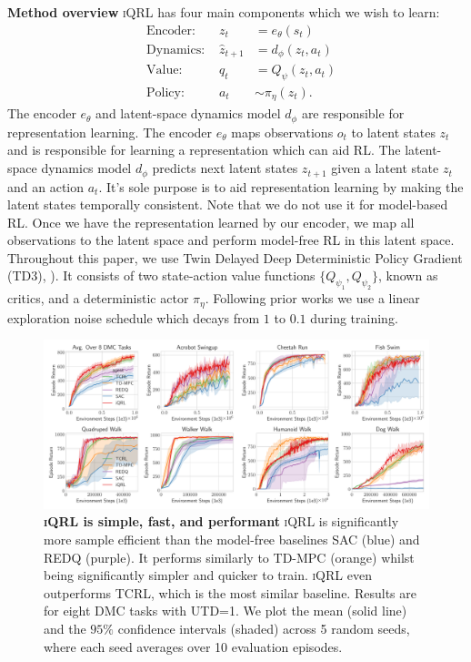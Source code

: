 \documentclass{article}
\theoremstyle{plain}
\theoremstyle{definition}
\theoremstyle{remark}
\newcommand{\our}{\textsc{iQRL}\xspace}
\begin{document}
\textbf{Method overview}
\our has four main components which we wish to learn:
\begin{align}
&\text{Encoder: } & z_{t} &= e_{\theta} (s_{t}) \label{eq:encoder} \\
&\text{Dynamics: } & \hat{z}_{t+1} &= d_{\phi} (z_{t}, a_{t}) \label{eq:transition} \\
&\text{Value: } & q_{t} &= Q_{\psi} (z_{t}, a_{t}) \label{eq:value} \\
&\text{Policy: } & a_{t} &\sim \pi_{\eta} (z_{t}) . \label{eq:policy}
\end{align}
The encoder $e_{\theta}$  and latent-space dynamics model $d_{\phi}$ are responsible for representation learning.
The encoder $e_{\theta}$ maps observations $o_{t}$ to latent states $z_{t}$ and is responsible for learning a representation
which can aid RL.
The latent-space dynamics model $d_{\phi}$ predicts next latent states $z_{t+1}$ given a latent state $z_{t}$ and an action $a_{t}$.
It's sole purpose is to aid representation learning by making the latent states temporally consistent.
Note that we do not use it for model-based RL.
Once we have the representation learned by our encoder, we map all observations to the latent space and perform model-free RL
in this latent space.
Throughout this paper, we use Twin Delayed Deep Deterministic Policy Gradient
(TD3), \citep{fujimotoAddressingFunctionApproximation2018}).
It consists of two state-action value functions $\{Q_{\psi_{1}},Q_{\psi_{2}} \}$, known as critics, and a deterministic
actor $\pi_{\eta}$.
Following prior works \citep{yaratsMasteringVisualContinuous2021} we use a linear exploration noise schedule
which decays from $1$ to $0.1$ during training.


\begin{figure}[ht]
\vskip 0.2in
\begin{center}
\centerline{\includegraphics[width=1.0\textwidth]{./figs/baselines_comparison.pdf}}
\caption{\textbf{\our is simple, fast, and performant} \our is significantly more sample efficient than the model-free baselines SAC (blue) and REDQ (purple). It performs similarly to TD-MPC (orange) whilst being significantly simpler and quicker to train. \our even outperforms TCRL, which is the most similar baseline. Results are for eight DMC tasks with UTD=1. We plot the mean (solid line) and the $95\%$ confidence intervals (shaded) across 5 random seeds, where each seed averages over 10 evaluation episodes.}

\label{fig:normalization_improves_sample_efficiency}
\end{center}
\vskip -0.2in
\end{figure}
\end{document}
